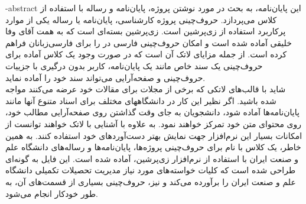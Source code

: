 \fa-abstract{
این پایان‌نامه، به بحث در مورد نوشتن پروژه، پایان‌نامه و رساله با استفاده از کلاس 
می‌پردازد.
حروف‌چینی پروژه کارشناسی، پایان‌نامه یا رساله یکی از موارد پرکاربرد استفاده از زی‌پرشین است. 
زی‌پرشین بسته‌ای است که به همت آقای وفا خلیقی آماده شده است و امکان حروف‌چینی فارسی در \lr{\LaTeXe}{} را  برای فارسی‌زبانان فراهم کرده است.
از جمله مزایای لاتک آن است که در صورت وجود یک کلاس آماده برای حروف‌چینی یک سند خاص مانند یک پایان‌نامه، کاربر بدون درگیری با جزییات حروف‌چینی و صفحه‌آرایی می‌تواند سند خود را آماده نماید.
\\
شاید با قالب‌های لاتکی که برخی از مجلات برای مقالات خود عرضه می‌کنند مواجه شده باشید. اگر نظیر این کار در دانشگاههای مختلف برای اسناد متنوع آنها مانند پایا‌ن‌نامه‌ها آماده شود، دانشجویان به جای وقت گذاشتن روی صفحه‌آرایی مطالب خود، روی محتوای متن خود تمرکز خواهند نمود. به علاوه با آشنایی با لاتک خواهند توانست از امکانات بسیار این نرم‌افزار جهت نمایش بهتر دست‌آوردهای خود استفاده کنند.
به همین خاطر، یک کلاس با نام 
 برای حروف‌چینی پروژه‌ها، پایان‌نامه‌ها و رساله‌های دانشگاه علم و صنعت ایران با استفاده از نرم‌افزار زی‌پرشین،  آماده شده است. این فایل به 
گونه‌ای طراحی شده است که کلیات خواسته‌های مورد نیاز  مدیریت تحصیلات تکمیلی دانشگاه علم و صنعت ایران را برآورده می‌کند و نیز، حروف‌چینی بسیاری از قسمت‌های آن، به طور خودکار انجام می‌شود.
}

%

\abstractPage

\newpage\clearpage